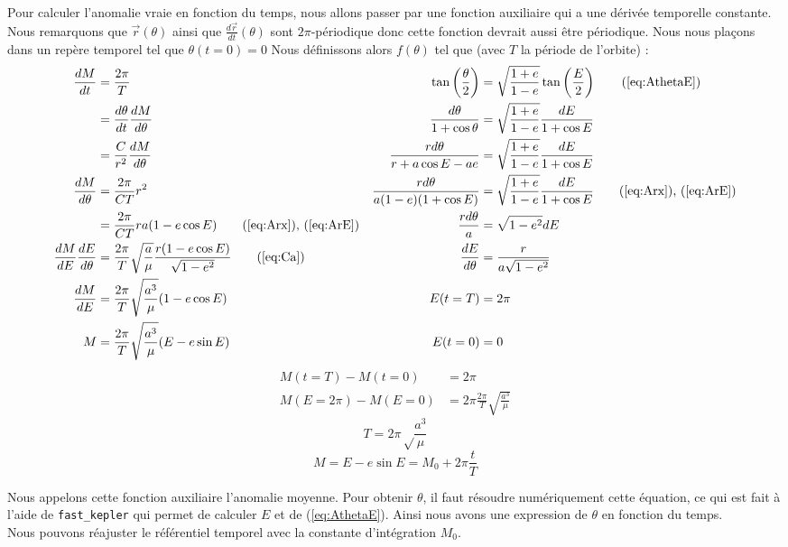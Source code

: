 \documentclass{report}
\begin{document}
Pour calculer l'anomalie vraie en fonction du temps, nous allons passer par une fonction auxiliaire qui a une dérivée temporelle constante. Nous remarquons que $\overrightarrow r(\theta)$ ainsi que $\frac{d\overrightarrow r}{dt}(\theta)$ sont $2\pi$-périodique donc cette fonction devrait aussi être périodique. Nous nous plaçons dans un repère temporel tel que $\theta(t=0)=0$ Nous définissons alors $f(\theta)$ tel que (avec $T$ la période de l'orbite)  :
\begin{align*}
\frac{dM}{dt}&=\frac{2\pi}{T}&\tan\left(\frac{\theta}{2}\right)&=\sqrt{\frac{1+e}{1-e}}\tan\left(\frac{E}{2}\right)\tag{\ref{eq:AthetaE}}\\
&=\frac{d\theta}{dt}\frac{dM}{d\theta}&\frac{d\theta}{1+\cos\theta}&=\sqrt{\frac{1+e}{1-e}}\frac{dE}{1+\cos E}\\
&=\frac{C}{r^2}\frac{dM}{d\theta}&\frac{rd\theta}{r+a\cos E-ae}&=\sqrt{\frac{1+e}{1-e}}\frac{dE}{1+\cos E}\\
\frac{dM}{d\theta}&=\frac{2\pi}{CT}r^2&\frac{rd\theta}{a(1-e)(1+\cos E)}&=\sqrt{\frac{1+e}{1-e}}\frac{dE}{1+\cos E}\tag{\ref{eq:Arx}), (\ref{eq:ArE}}\\
&=\frac{2\pi}{CT}ra(1-e\cos E)\tag{\ref{eq:Arx}), (\ref{eq:ArE}}&\frac{rd\theta}{a}&=\sqrt{1-e^2}dE\\
\frac{dM}{dE}\frac{dE}{d\theta}&=\frac{2\pi}{T}\sqrt{\frac{a}{\mu}}\frac{r(1-e\cos E)}{\sqrt{1-e^2}}\tag{\ref{eq:Ca}}
&\frac{dE}{d\theta}&=\frac{r}{a\sqrt{1-e^2}}\\
\frac{dM}{dE}&=\frac{2\pi}{T}\sqrt{\frac{a^3}{\mu}}(1-e\cos E)&E(t=T)&=2\pi\\
M&=\frac{2\pi}{T}\sqrt{\frac{a^3}{\mu}}(E-e\sin E)&E(t=0)&=0
\end{align*}
\begin{align*}
M(t=T)-M(t=0)&=2\pi\\
M(E=2\pi)-M(E=0)&=2\pi\frac{2\pi}{T}\sqrt{\frac{a^3}{\mu}}
\end{align*}
\begin{equation}\boxed{T=2\pi\sqrt\frac{a^3}{\mu}}\label{eq:T}\end{equation}
\begin{equation}\boxed{M=E-e\sin E=M_0+2\pi\frac{t}{T}}\label{eq:M}\end{equation}

Nous appelons cette fonction auxiliaire l'anomalie moyenne. Pour obtenir $\theta$, il faut résoudre numériquement cette équation, ce qui est fait à l'aide de \verb|fast_kepler| qui permet de calculer $E$ et de (\ref{eq:AthetaE}). Ainsi nous avons une expression de $\theta$ en fonction du temps.
\\\indent Nous pouvons réajuster le référentiel temporel avec la constante d'intégration $M_0$.
\end{document}
